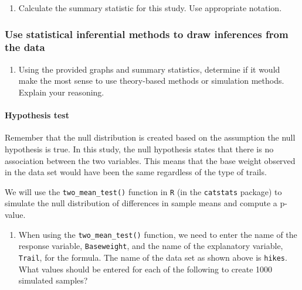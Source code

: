\documentclass[
]{report}
\providecommand{\tightlist}{%
  \setlength{\itemsep}{0pt}\setlength{\parskip}{0pt}}
\begin{document}
\begin{enumerate}
\def\labelenumi{\arabic{enumi}.}
\setcounter{enumi}{3}
\tightlist
\item
  Calculate the summary statistic for this study. Use appropriate notation.
\end{enumerate}

\vspace{1in}

\hypertarget{use-statistical-inferential-methods-to-draw-inferences-from-the-data-2}{%
\subsubsection*{Use statistical inferential methods to draw inferences from the data}\label{use-statistical-inferential-methods-to-draw-inferences-from-the-data-2}}

\begin{enumerate}
\def\labelenumi{\arabic{enumi}.}
\setcounter{enumi}{4}
\tightlist
\item
  Using the provided graphs and summary statistics, determine if it would make the most sense to use theory-based methods or simulation methods. Explain your reasoning.
\end{enumerate}

\vspace{0.8in}

\hypertarget{hypothesis-test-2}{%
\paragraph*{Hypothesis test}\label{hypothesis-test-2}}

Remember that the null distribution is created based on the assumption the null hypothesis is true. In this study, the null hypothesis states that there is no association between the two variables. This means that the base weight observed in the data set would have been the same regardless of the type of trails.

We will use the \texttt{two\_mean\_test()} function in \texttt{R} (in the \texttt{catstats} package) to simulate the null distribution of differences in sample means and compute a p-value.

\begin{enumerate}
\def\labelenumi{\arabic{enumi}.}
\setcounter{enumi}{5}
\tightlist
\item
  When using the \texttt{two\_mean\_test()} function, we need to enter the name of the response variable, \texttt{Baseweight}, and the name of the explanatory variable, \texttt{Trail}, for the formula. The name of the data set as shown above is \texttt{hikes}. What values should be entered for each of the following to create 1000 simulated samples?
\end{enumerate}
\end{document}
